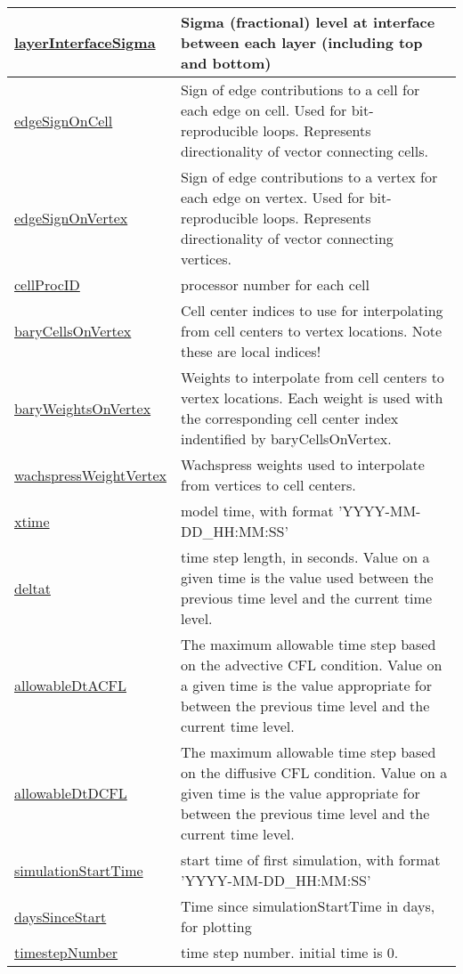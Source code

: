 {\begin{center}
\begin{longtable}{| p{2.0in} | p{4.0in} |}
    \hline
    \hyperref[subsec:var_sec_mesh_layerInterfaceSigma]{layerInterfaceSigma} & Sigma (fractional) level at interface between each layer (including top and bottom) \\
    \hline
    \hyperref[subsec:var_sec_mesh_edgeSignOnCell]{edgeSignOnCell} & Sign of edge contributions to a cell for each edge on cell. Used for bit-reproducible loops. Represents directionality of vector connecting cells. \\
    \hline
    \hyperref[subsec:var_sec_mesh_edgeSignOnVertex]{edgeSignOnVertex} & Sign of edge contributions to a vertex for each edge on vertex. Used for bit-reproducible loops. Represents directionality of vector connecting vertices. \\
    \hline
    \hyperref[subsec:var_sec_mesh_cellProcID]{cellProcID} & processor number for each cell \\
    \hline
    \hyperref[subsec:var_sec_mesh_baryCellsOnVertex]{baryCellsOnVertex} & Cell center indices to use for interpolating from cell centers to vertex locations.  Note these are local indices! \\
    \hline
    \hyperref[subsec:var_sec_mesh_baryWeightsOnVertex]{baryWeightsOnVertex} & Weights to interpolate from cell centers to vertex locations.  Each weight is used with the corresponding cell center index indentified by baryCellsOnVertex. \\
    \hline
    \hyperref[subsec:var_sec_mesh_wachspressWeightVertex]{wachspressWeightVertex} & Wachspress weights used to interpolate from vertices to cell centers. \\
    \hline
    \hyperref[subsec:var_sec_mesh_xtime]{xtime} & model time, with format 'YYYY-MM-DD\_HH:MM:SS' \\
    \hline
    \hyperref[subsec:var_sec_mesh_deltat]{deltat} & time step length, in seconds.  Value on a given time is the value used between the previous time level and the current time level. \\
    \hline
    \hyperref[subsec:var_sec_mesh_allowableDtACFL]{allowableDtACFL} & The maximum allowable time step based on the advective CFL condition.  Value on a given time is the value appropriate for  between the previous time level and the current time level. \\
    \hline
    \hyperref[subsec:var_sec_mesh_allowableDtDCFL]{allowableDtDCFL} & The maximum allowable time step based on the diffusive CFL condition.  Value on a given time is the value appropriate for  between the previous time level and the current time level. \\
    \hline
    \hyperref[subsec:var_sec_mesh_simulationStartTime]{simulationStartTime} & start time of first simulation, with format 'YYYY-MM-DD\_HH:MM:SS' \\
    \hline
    \hyperref[subsec:var_sec_mesh_daysSinceStart]{daysSinceStart} & Time since simulationStartTime in days, for plotting \\
    \hline
    \hyperref[subsec:var_sec_mesh_timestepNumber]{timestepNumber} & time step number.  initial time is 0. \\
    \hline
\end{longtable}
\end{center}
}
